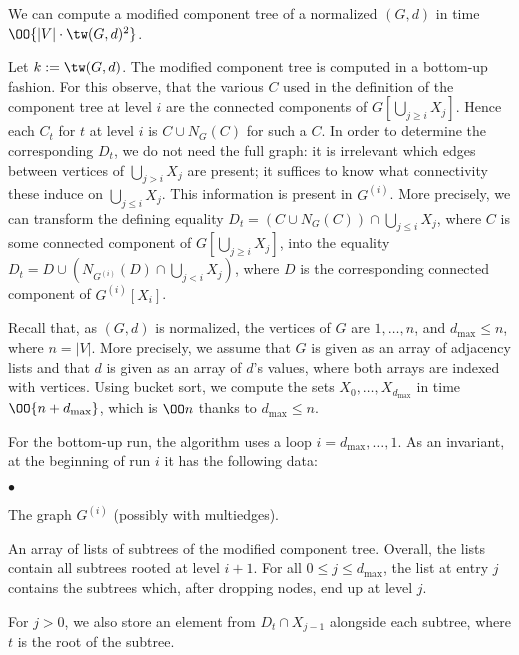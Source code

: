 \documentclass{LMCS}
\begin{document}
\begin{lem}\label{lem:comp-tree}
We can compute a modified component tree of a normalized $(G,d)$ 
in time $\OO{|V|\cdot\tw(G,d)^2}$. 
\end{lem}

\proof
Let $k:=\tw(G,d)$. 
The modified component tree is computed in a bottom-up fashion. 
For this observe, that the various $C$ 
used in the definition of the component tree at level $i$ 
are the connected components of $G[\bigcup\limits_{j\geq i}X_j]$. 
Hence each $C_t$ for $t$ at level $i$ is $C\cup N_G(C)$ for such a $C$. 
In order to determine the corresponding $D_t$, we do not need the full graph: 
it is irrelevant which edges  
between vertices of $\bigcup\limits_{j>i}X_j$ are present; 
it suffices to know 
what connectivity these induce on $\bigcup\limits_{j\leq i}X_j$. 
This information is present in $G^{(i)}$. 
More precisely, we can transform the defining equality 
$D_t=(C\cup N_G(C))\cap\bigcup\limits_{j\leq i}X_j$, 
where $C$ is some connected component of $G[\bigcup\limits_{j\geq i}X_j]$, 
into the equality $D_t=D\cup(N_{G^{(i)}}(D) \cap \bigcup\limits_{j<i}X_j)$, 
where $D$ is the corresponding connected component of $G^{(i)}[X_i]$. 

Recall that, as $(G,d)$ is normalized, 
the vertices of $G$ are $1,\ldots,n$, and $d_{\max}\leq n$, where $n=|V|$. 
More precisely, we assume that $G$ is given as an array of adjacency lists 
and that $d$ is given as an array of $d$'s values, 
where both arrays are indexed with vertices. 
Using bucket sort, we compute the sets $X_0,\ldots,X_{d_{\max}}$ 
in time $\OO{n+d_{\max}}$, which is $\OO n$ thanks to $d_{\max}\leq n$. 

For the bottom-up run, the algorithm uses a loop $i=d_{\max},\ldots,1$. 
As an invariant, at the beginning of run $i$ it has the following data: 
\begin{iteMize}{$\bullet$}
\item The graph $G^{(i)}$ (possibly with multiedges). 
\item An array of lists of subtrees of the modified component tree. 
  Overall, the lists contain all subtrees rooted at level $i+1$. 
  For all $0\leq j\leq d_{\max}$, the list at entry $j$ contains the subtrees which, 
  after dropping nodes, end up at level $j$. 

  For $j>0$, 
  we also store an element from $D_t\cap X_{j-1}$ alongside each subtree, 
  where $t$ is the root of the subtree.\smallskip 
\end{iteMize}
\end{document}
